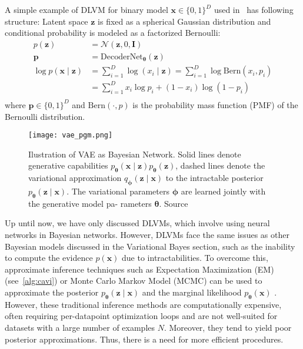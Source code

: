 \begin{example}
    A simple example of DLVM for binary model $\mathbf{x} \in \{0,1\}^{D}$ used in~\cite{vae-ssl-dgm-2014} has following structure:
    Latent space $\mathbf{z}$ is fixed as a spherical Gaussian distribution and conditional probability is modeled as
    a factorized Bernoulli:
    \begin{align*}
        p(\mathbf{z}) &= \mathcal{N}(\mathbf{z},0,\mathbf{I})\\
        \mathbf{p} &= \mathrm{DecoderNet}_{\boldsymbol{\theta}}(\mathbf{z}) \\
        \log p(\mathbf{x}\mid \mathbf{z}) &= \sum_{i=1}^D \log(x_i \mid  \mathbf{z}) = \sum_{i=1}^D \log \mathrm{Bern}(x_i,p_i)\\
        &= \sum_{i=1}^D x_i \log p_i + (1-x_i) \log(1-p_i)\\
    \end{align*}
    where $\mathbf{p} \in \{0,1\}^{D}$ and $\mathrm{Bern}(\cdot,p)$ is the probability mass function (PMF)
    of the Bernoulli distribution.
\end{example}

\begin{figure}[tb]
    \centering
    \texttt{[image: vae\_pgm.png]}
    \caption[VAE as Bayesian network]{Ilustration of VAE as Bayesian Network. Solid lines denote generative capabilities 
    $p_{\boldsymbol{\theta}}(\mathbf{x}\mid \mathbf{z})p_{\boldsymbol{\theta}}(\mathbf{z})$, dashed lines denote the variational approximation $q_{\boldsymbol{\phi}}(\mathbf{z}\mid \mathbf{x})$
    to the intractable posterior $p_{\boldsymbol{\theta}}(\mathbf{z}\mid \mathbf{x})$. The variational parameters ${\boldsymbol{\phi}}$ are learned jointly with the generative model pa-
    rameters ${\boldsymbol{\theta}}$. Source \cite{vae-original-2013}}
    \label{fig:vae_pgm}
\end{figure}

Up until now, we have only discussed DLVMs, which involve using neural networks in Bayesian networks. However, DLVMs face the same issues as 
other Bayesian models discussed in the Variational Bayes section, such as the inability to compute the evidence $p(\mathbf{x})$ due to 
intractabilities. To overcome this, approximate inference techniques such as Expectation Maximization (EM) (see~\ref{alg:cavi}) or 
Monte Carlo Markov Model (MCMC)  can be used to approximate the posterior $p_{\boldsymbol{\theta}}(\mathbf{z}\mid \mathbf{x})$ and the marginal 
likelihood $p_{\boldsymbol{\theta}}(\mathbf{x})$ \cite[appx.~A2]{intro-vae-2019}.  However, these traditional inference methods are computationally expensive,
often requiring per-datapoint optimization loops and are not well-suited for datasets with a large number of examples $N$. Moreover, they tend
to yield poor posterior approximations. Thus, there is a need for more efficient procedures.

